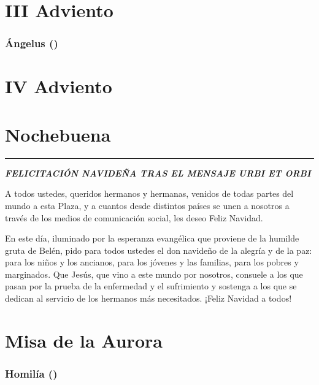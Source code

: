 \section{III Adviento} 







\subsubsection{Ángelus ()}

\section{IV Adviento} 


\section{Nochebuena} 









\begin{center}\rule{0.5\linewidth}{\linethickness}\end{center}

\textbf{\emph{FELICITACIÓN NAVIDEÑA TRAS EL MENSAJE URBI ET ORBI}}

A todos ustedes, queridos hermanos y hermanas, venidos de todas partes del mundo a esta Plaza, y a cuantos desde distintos países se unen a nosotros a través de los medios de comunicación social, les deseo Feliz Navidad.

En este día, iluminado por la esperanza evangélica que proviene de la humilde gruta de Belén, pido para todos ustedes el don navideño de la alegría y de la paz: para los niños y los ancianos, para los jóvenes y las familias, para los pobres y marginados. Que Jesús, que vino a este mundo por nosotros, consuele a los que pasan por la prueba de la enfermedad y el sufrimiento y sostenga a los que se dedican al servicio de los hermanos más necesitados. ¡Feliz Navidad a todos!





\section{Misa de la Aurora} 


\subsubsection{Homilía ()}

